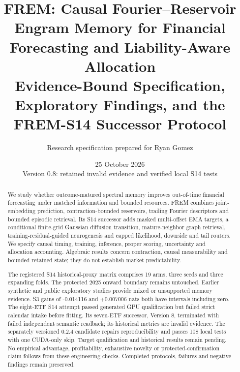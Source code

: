 \documentclass[11pt,a4paper]{article}
\title{FREM: Causal Fourier--Reservoir Engram Memory for Financial Forecasting and Liability-Aware Allocation\\\large Evidence-Bound Specification, Exploratory Findings, and the FREM-S14 Successor Protocol}
\author{Research specification prepared for Ryan Gomez}
\date{25 October 2026\\Version 0.8: retained invalid evidence and verified local S14 tests}
\begin{document}
\maketitle
\begin{center}
\end{center}

\begin{abstract}
We study whether outcome-matured spectral memory improves out-of-time financial
forecasting under matched information and bounded resources. FREM combines
joint-embedding prediction, contraction-bounded reservoirs, trailing Fourier
descriptors and bounded episodic retrieval. Its S14 successor adds masked
multi-offset EMA targets, a conditional finite-grid Gaussian diffusion
transition, mature-neighbor graph retrieval, training-residual-guided
neurogenesis and capped likelihood, downside and tail routers. We specify
causal timing, training, inference, proper scoring, uncertainty and allocation
accounting. Algebraic results concern contraction, causal measurability and
bounded retained state; they do not establish market predictability.

The registered S14 historical-proxy matrix comprises 19 arms, three seeds and
three expanding folds. The protected 2025 onward boundary remains untouched.
Earlier synthetic and public exploratory studies provide mixed or unsupported
memory evidence. S3 gains of -0.014116 and +0.007006 nats both have intervals
including zero. The eight-ETF S14 attempt passed generated GPU qualification
but failed strict calendar intake before fitting. Its seven-ETF successor,
Version 8, terminated with failed independent semantic readback; its historical
metrics are invalid evidence. The separately versioned 0.2.4 candidate repairs
reproducibility and passes 108 local tests with one CUDA-only skip. Target
qualification and historical results remain pending. No empirical advantage,
profitability, exhaustive novelty or protected-confirmation claim follows from
these engineering checks. Completed protocols, failures and negative findings
remain preserved.
\end{abstract}
\newpage
\begingroup
\small
\setlength{\parskip}{0pt}
\tableofcontents
\endgroup
\newpage
\end{document}
